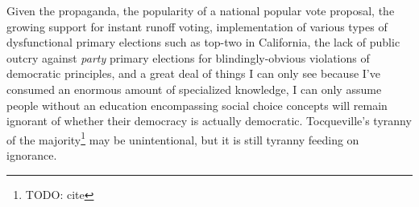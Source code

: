 Given the propaganda, the popularity of a national popular vote proposal, the growing support for instant runoff voting, implementation of various types of dysfunctional primary elections such as top-two in California, the lack of public outcry against \textit{party} primary elections for blindingly-obvious violations of democratic principles, and a great deal of things I can only see because I've consumed an enormous amount of specialized knowledge, I can only assume people without an education encompassing social choice concepts will remain ignorant of whether their democracy is actually democratic.  Tocqueville's tyranny of the majority\footnote{TODO: cite} may be unintentional, but it is still tyranny feeding on ignorance.
